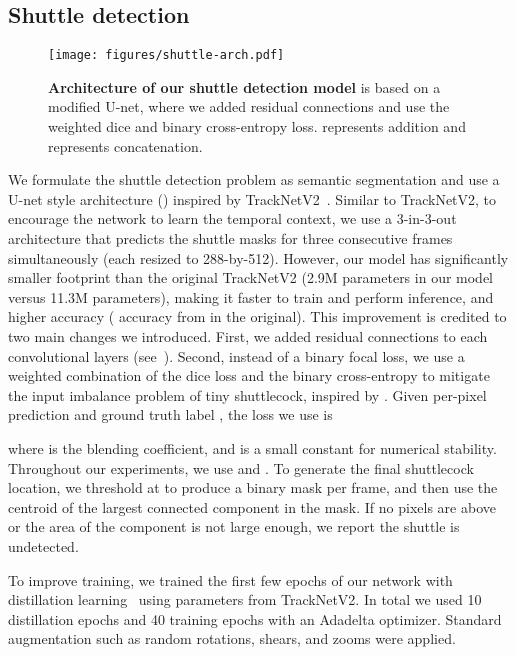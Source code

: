 \subsection{Shuttle detection}
\label{sec:shuttle-tracking}
\begin{figure}[ht]
    \centering
    \texttt{[image: figures/shuttle-arch.pdf]}
    \caption{{\bf Architecture of our shuttle detection model} is based on a modified U-net, where we added residual connections and use the weighted dice and binary cross-entropy loss.  represents addition and  represents concatenation.}
    \label{fig:our-tracknet}
\end{figure}

We formulate the shuttle detection problem as semantic segmentation and use a U-net style architecture () inspired by TrackNetV2~\cite{sun_tracknetv2_2020}. Similar to TrackNetV2, to encourage the network to learn the temporal context, we use a 3-in-3-out architecture that predicts the shuttle masks for three consecutive frames simultaneously (each resized to 288-by-512). However, our model has significantly smaller footprint than the original TrackNetV2 (2.9M parameters in our model versus 11.3M parameters), making it faster to train and perform inference, and higher accuracy ( accuracy from  in the original). This improvement is credited to two main changes we introduced. First, we added residual connections to each convolutional layers (see~). Second, instead of a binary focal loss, we use a weighted combination of the dice loss and the binary cross-entropy to mitigate the input imbalance problem of tiny shuttlecock, inspired by \cite{combo_loss}. Given per-pixel prediction  and ground truth label , the loss  we use is

where  is the blending coefficient, and  is a small constant for numerical stability. Throughout our experiments, we use  and . To generate the final shuttlecock location, we threshold  at  to produce a binary mask per frame, and then use the centroid of the largest connected component in the mask. If no pixels are above  or the area of the component is not large enough, we report the shuttle is undetected.

To improve training, we trained the first few epochs of our network with distillation learning~\cite{HVD15} using parameters from TrackNetV2. In total we used 10 distillation epochs and 40 training epochs with an Adadelta optimizer. Standard augmentation such as random rotations, shears, and zooms were applied.



